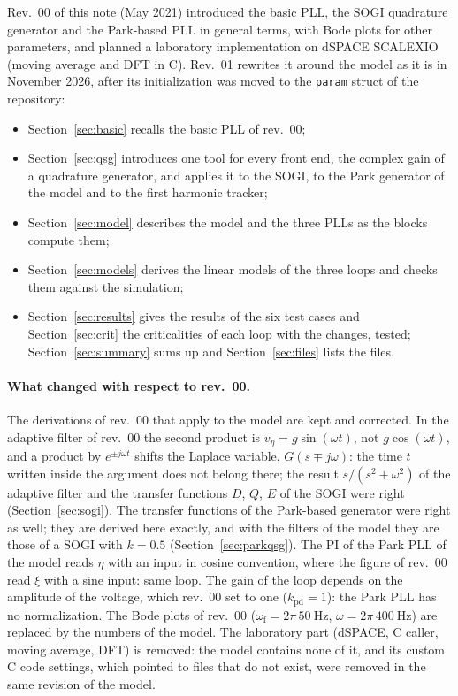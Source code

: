 \documentclass[11pt,a4paper]{scrartcl}
\newcommand{\ped}[1]{_{\mathrm{#1}}}
\newcommand{\code}[1]{\texttt{#1}}
\begin{document}
\begin{onehalfspace}
Rev.~00 of this note (May 2021) introduced the basic PLL, the SOGI quadrature generator and the Park-based PLL in general terms, with Bode plots for other parameters, and planned a laboratory implementation on dSPACE SCALEXIO (moving average and DFT in C). Rev.~01 rewrites it around the model as it is in November 2026, after its initialization was moved to the \code{param} struct of the repository:
\begin{itemize}[nosep]
	\item Section~\ref{sec:basic} recalls the basic PLL of rev.~00;
	\item Section~\ref{sec:qsg} introduces one tool for every front end, the complex gain of a quadrature generator, and applies it to the SOGI, to the Park generator of the model and to the first harmonic tracker;
	\item Section~\ref{sec:model} describes the model and the three PLLs as the blocks compute them;
	\item Section~\ref{sec:models} derives the linear models of the three loops and checks them against the simulation;
	\item Section~\ref{sec:results} gives the results of the six test cases and Section~\ref{sec:crit} the criticalities of each loop with the changes, tested; Section~\ref{sec:summary} sums up and Section~\ref{sec:files} lists the files.
\end{itemize}

\paragraph{What changed with respect to rev.~00.} The derivations of rev.~00 that apply to the model are kept and corrected. In the adaptive filter of rev.~00 the second product is $v_\eta = g \sin(\omega t)$, not $g\cos(\omega t)$, and a product by $e^{\pm j\omega t}$ shifts the Laplace variable, $G(s \mp j\omega)$: the time $t$ written inside the argument does not belong there; the result $s/(s^2+\omega^2)$ of the adaptive filter and the transfer functions $D$, $Q$, $E$ of the SOGI were right (Section~\ref{sec:sogi}). The transfer functions of the Park-based generator were right as well; they are derived here exactly, and with the filters of the model they are those of a SOGI with $k = 0.5$ (Section~\ref{sec:parkqsg}). The PI of the Park PLL of the model reads $\eta$ with an input in cosine convention, where the figure of rev.~00 read $\xi$ with a sine input: same loop. The gain of the loop depends on the amplitude of the voltage, which rev.~00 set to one ($k\ped{pd} = 1$): the Park PLL has no normalization. The Bode plots of rev.~00 ($\omega\ped{f} = 2\pi\,\SI{50}{\hertz}$, $\omega = 2\pi\,\SI{400}{\hertz}$) are replaced by the numbers of the model. The laboratory part (dSPACE, C caller, moving average, DFT) is removed: the model contains none of it, and its custom C code settings, which pointed to files that do not exist, were removed in the same revision of the model.


\end{onehalfspace}
\end{document}
